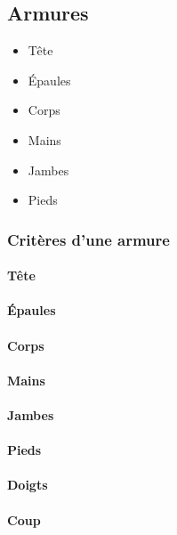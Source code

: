 \documentclass[11pt, a4paper, oneside]{report}
\begin{document}
\subsection{Armures}
\begin{multicols}{2}
\begin{itemize}
    \item Tête
    \item Épaules
    \item Corps
    \item Mains
    \item Jambes
    \item Pieds
\end{itemize}
\end{multicols}
\subsubsection{Critères d'une armure}
\paragraph{Tête}

\paragraph{Épaules}

\paragraph{Corps}

\paragraph{Mains}

\paragraph{Jambes}

\paragraph{Pieds}

\paragraph{Doigts}

\paragraph{Coup}
\end{document}
